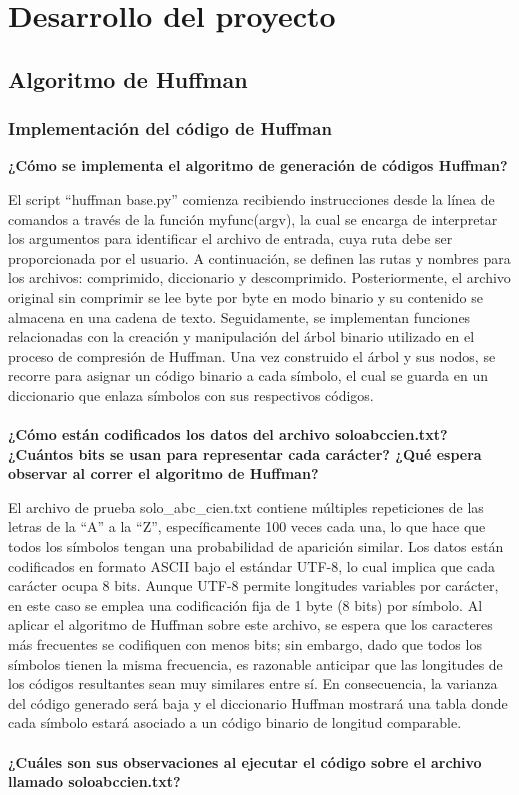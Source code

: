 \documentclass[conference,onecolumn,12pt]{IEEEtran}
\numberwithin{equation}{subsection}
\begin{document}
\section{Desarrollo del proyecto}

\subsection{Algoritmo de Huffman}

\subsubsection{Implementación del código de Huffman}
\hfill\break 

\textbf{¿Cómo se implementa el algoritmo de generación de códigos Huffman?}


El script “huffman base.py” comienza recibiendo instrucciones desde la línea de comandos a través de la función myfunc(argv), la cual se encarga de interpretar los argumentos para identificar el archivo de entrada, cuya ruta debe ser proporcionada por el usuario. A continuación, se definen las rutas y nombres para los archivos: comprimido, diccionario y descomprimido. Posteriormente, el archivo original sin comprimir se lee byte por byte en modo binario y su contenido se almacena en una cadena de texto. Seguidamente, se implementan funciones relacionadas con la creación y manipulación del árbol binario utilizado en el proceso de compresión de Huffman. Una vez construido el árbol y sus nodos, se recorre para asignar un código binario a cada símbolo, el cual se guarda en un diccionario que enlaza símbolos con sus respectivos códigos.
\\
\\
\textbf{¿Cómo están codificados los datos del archivo solo\textunderscore abc\textunderscore cien.txt? ¿Cuántos bits se usan para representar cada carácter? ¿Qué espera observar al correr el algoritmo de Huffman?}

El archivo de prueba solo_abc_cien.txt contiene múltiples repeticiones de las letras de la “A” a la “Z”, específicamente 100 veces cada una, lo que hace que todos los símbolos tengan una probabilidad de aparición similar. Los datos están codificados en formato ASCII bajo el estándar UTF-8, lo cual implica que cada carácter ocupa 8 bits. Aunque UTF-8 permite longitudes variables por carácter, en este caso se emplea una codificación fija de 1 byte (8 bits) por símbolo. Al aplicar el algoritmo de Huffman sobre este archivo, se espera que los caracteres más frecuentes se codifiquen con menos bits; sin embargo, dado que todos los símbolos tienen la misma frecuencia, es razonable anticipar que las longitudes de los códigos resultantes sean muy similares entre sí. En consecuencia, la varianza del código generado será baja y el diccionario Huffman mostrará una tabla donde cada símbolo estará asociado a un código binario de longitud comparable.
\\
\\
\textbf{¿Cuáles son sus observaciones al ejecutar el código sobre el archivo llamado solo\textunderscore abc\textunderscore cien.txt?}
\end{document}
